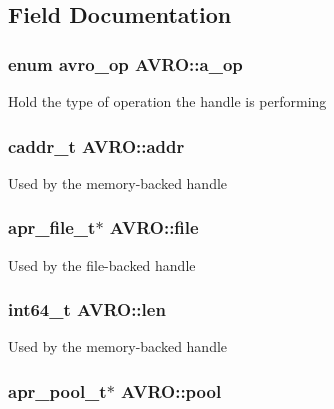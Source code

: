 \subsection{Field Documentation}
\hypertarget{struct_a_v_r_o_7291c82adfe53e2d895824663e028e8e}{
\subsubsection[{a\_\-op}]{\setlength{\rightskip}{0pt plus 5cm}enum {\bf avro\_\-op} {\bf AVRO::a\_\-op}}}
\label{struct_a_v_r_o_7291c82adfe53e2d895824663e028e8e}


Hold the type of operation the handle is performing \hypertarget{struct_a_v_r_o_b1c64881a5280cceb600f316fbb07952}{
\subsubsection[{addr}]{\setlength{\rightskip}{0pt plus 5cm}caddr\_\-t {\bf AVRO::addr}}}
\label{struct_a_v_r_o_b1c64881a5280cceb600f316fbb07952}


Used by the memory-backed handle \hypertarget{struct_a_v_r_o_adc436b34c7426022b819cdc2d6ced6e}{
\subsubsection[{file}]{\setlength{\rightskip}{0pt plus 5cm}apr\_\-file\_\-t$\ast$ {\bf AVRO::file}}}
\label{struct_a_v_r_o_adc436b34c7426022b819cdc2d6ced6e}


Used by the file-backed handle \hypertarget{struct_a_v_r_o_167d3abd38fca62643a5ceb0c34711bc}{
\subsubsection[{len}]{\setlength{\rightskip}{0pt plus 5cm}int64\_\-t {\bf AVRO::len}}}
\label{struct_a_v_r_o_167d3abd38fca62643a5ceb0c34711bc}


Used by the memory-backed handle \hypertarget{struct_a_v_r_o_b4cc960de06bd42633124a8a62852928}{
\subsubsection[{pool}]{\setlength{\rightskip}{0pt plus 5cm}apr\_\-pool\_\-t$\ast$ {\bf AVRO::pool}}}
\label{struct_a_v_r_o_b4cc960de06bd42633124a8a62852928}


